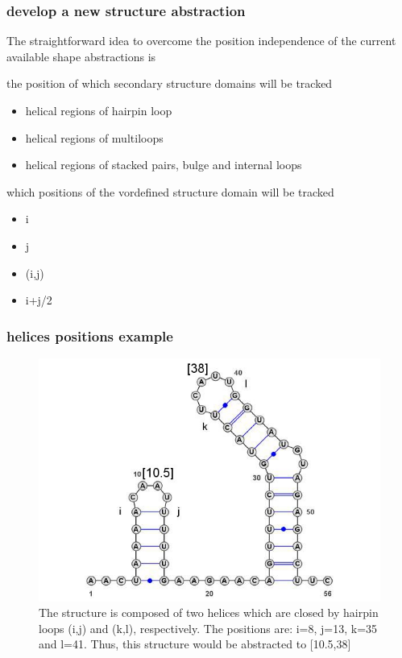 \documentclass[ignorenonframetext,10pt]{beamer}
\begin{document}
\begin{frame}
\frametitle{develop a new structure abstraction}
    The straightforward idea to overcome the position independence of the
    current available shape abstractions is
    \begin{block}{the position of which secondary structure domains will be
    tracked}
    \begin{itemize} 
    \item helical regions of hairpin loop
    \item helical regions of multiloops %
    \item helical regions of stacked pairs, bulge and internal loops %
    \end{itemize}
    \end{block}
    \begin{block}{which positions of the vordefined structure domain will be tracked}
    \begin{itemize} 
    \item i
    \item j   
    \item (i,j)
    \item i+j/2
    \end{itemize}    
    \end{block}
\end{frame}

\begin{frame}
\frametitle{helices positions example}  
\begin{figure}
  \includegraphics[scale=0.5]{images/helices_position.jpg} 
  \caption{The structure is composed of two helices which are closed by hairpin
  loops (i,j) and (k,l), respectively. The positions are: i=8, j=13, k=35 and
  l=41. Thus, this structure would be abstracted to [10.5,38]}
\end{figure}
\end{frame}
\end{document}
